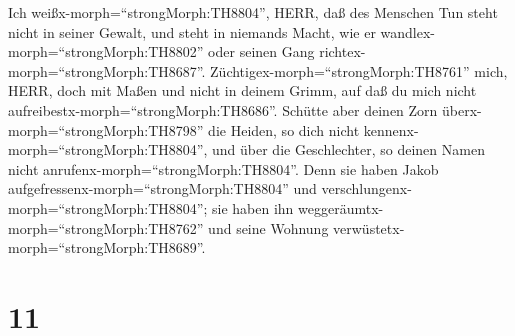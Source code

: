  Ich weißx-morph=``strongMorph:TH8804'', HERR, daß des
Menschen Tun steht nicht in seiner Gewalt, und steht in niemands Macht,
wie er wandlex-morph=``strongMorph:TH8802'' oder seinen Gang
richtex-morph=``strongMorph:TH8687''. 
Züchtigex-morph=``strongMorph:TH8761'' mich, HERR, doch mit Maßen und
nicht in deinem Grimm, auf daß du mich nicht
aufreibestx-morph=``strongMorph:TH8686''.  Schütte aber
deinen Zorn überx-morph=``strongMorph:TH8798'' die Heiden, so dich nicht
kennenx-morph=``strongMorph:TH8804'', und über die Geschlechter, so
deinen Namen nicht anrufenx-morph=``strongMorph:TH8804''. Denn sie haben
Jakob aufgefressenx-morph=``strongMorph:TH8804'' und
verschlungenx-morph=``strongMorph:TH8804''; sie haben ihn
weggeräumtx-morph=``strongMorph:TH8762'' und seine Wohnung
verwüstetx-morph=``strongMorph:TH8689''.

\hypertarget{section-10}{%
\section{11}\label{section-10}}

